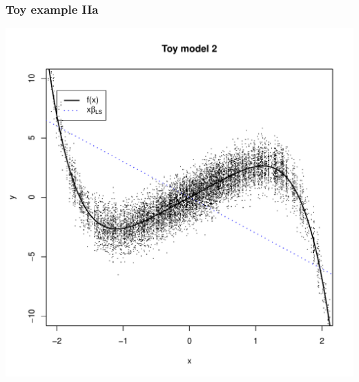 \documentclass{beamer}
\begin{document}
\begin{frame}
\frametitle{Toy example IIa}
\begin{center}
\includegraphics[scale = 0.4]{toy3a_plot.pdf}
\end{center}
\end{frame}
\end{document}
